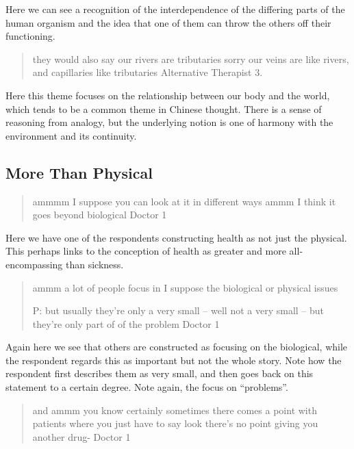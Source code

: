 Here we can see a recognition of the interdependence of the differing parts of the human organism and the idea that one of them can throw the others off their functioning. 



\begin{quotation}
  they would also say our rivers are tributaries sorry our veins are like rivers, and capillaries like tributaries 
Alternative Therapist 3. 
\end{quotation}

Here this theme focuses on the relationship between our body and the world, which tends to be a common theme in Chinese thought. There is a sense of reasoning from analogy, but the underlying notion is one of harmony with the environment and its continuity. 


\subsection{More Than Physical}
\label{sec:more-than-physical}

\begin{quotation}
  ammmm I suppose you can look at it in different ways ammm I think it goes beyond biological 
Doctor 1
\end{quotation}

Here we have one of the respondents constructing health as not just the physical. This perhaps links to the conception of health as greater and more all-encompassing than sickness. 

\begin{quotation}
  ammm a lot of people focus in I suppose the biological or physical issues

P: but usually they're only a very small – well not a very small – but they're only part of of the problem
Doctor 1
\end{quotation}

Again here we see that others are constructed as focusing on the biological, while the respondent regards this as important but not the whole story. Note how the respondent first describes them as very small, and then goes back on this statement to a certain degree. Note again, the focus on ``problems''. 


\begin{quotation}
and ammm you know certainly sometimes there comes a point with patients where you just have to say look there's no point giving you another drug-
Doctor 1  
\end{quotation}


